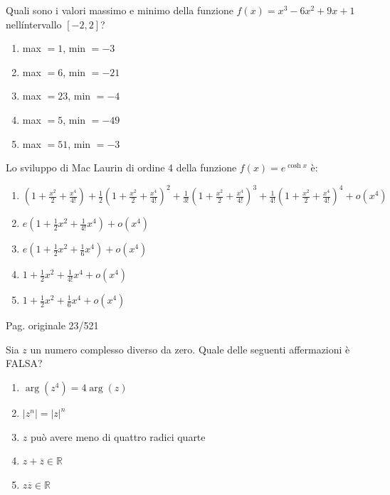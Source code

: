 \begin{quiz}
Quali sono i valori massimo e minimo della funzione $f(x)=x^3-6x^2+9x+1$ nell\'intervallo $[-2,2]$?
\begin{enumerate}[label=\alph*),leftmargin=1.3cm,itemsep=3pt,topsep=5pt]
\item max $=1$, min $=-3$
\item max $=6$, min $=-21$
\item max $=23$, min $=-4$
\item max $=5$, min $=-49$
\item max $=51$, min $=-3$
\end{enumerate}
\end{quiz}

\begin{quiz}
Lo sviluppo di Mac Laurin di ordine 4 della funzione $f(x)=e^{\cosh x}$ \`e:
\begin{enumerate}[label=\alph*),leftmargin=1.3cm,itemsep=3pt,topsep=5pt]
\item $(1+\frac{x^2}2+\frac{x^4}{4!})+\frac12(1+\frac{x^2}2+\frac{x^4}{4!})^2+\frac1{3!}(1+\frac{x^2}2+\frac{x^4}{4!})^3+\frac1{4!}(1+\frac{x^2}2+\frac{x^4}{4!})^4+o(x^4)$
\item $e(1+\frac12x^2+\frac1{4!}x^4)+o(x^4)$
\item $e(1+\frac12x^2+\frac16x^4)+o(x^4)$
\item $1+\frac12x^2+\frac1{4!}x^4+o(x^4)$
\item $1+\frac12x^2+\frac16x^4+o(x^4)$
\end{enumerate}
\end{quiz}

\par\noindent\hfill{\color{cyan!65!black}\scriptsize Pag. originale 23/521}\par\smallskip

\begin{quiz}
Sia $z$ un numero complesso diverso da zero. Quale delle seguenti affermazioni \`e FALSA?
\begin{enumerate}[label=\alph*),leftmargin=1.3cm,itemsep=3pt,topsep=5pt]
\item $\arg(z^4)=4\arg(z)$
\item $|z^n|=|z|^n$
\item $z$ pu\`o avere meno di quattro radici quarte
\item $z+\overline z\in\mathbb R$
\item $z\overline z\in\mathbb R$
\end{enumerate}
\end{quiz}

